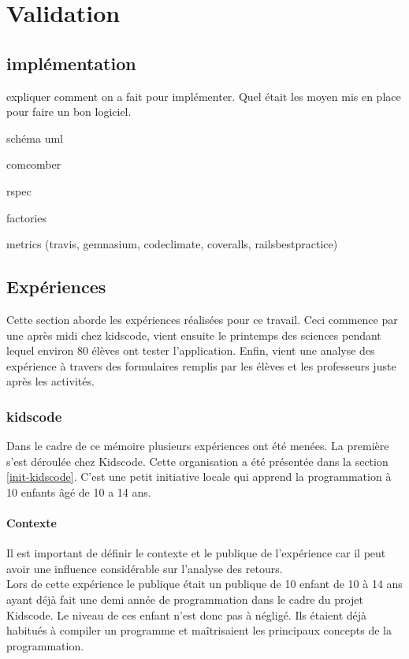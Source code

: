 \chapter{Validation}
\section{implémentation}
expliquer comment on a fait pour implémenter. Quel était les moyen mis en place pour faire un bon logiciel.

schéma uml

comcomber

rspec

factories

metrics (travis, gemnasium, codeclimate, coveralls, railsbestpractice)

\section{Expériences}
Cette section aborde les expériences réalisées pour ce travail. Ceci commence par une après midi chez kidscode, vient ensuite le printemps des sciences pendant lequel environ 80 élèves ont tester l'application. Enfin, vient une analyse des expérience à travers des formulaires remplis par les élèves et les professeurs juste après les activités. %
\subsection{kidscode}
\label{kidscode}
Dans le cadre de ce mémoire plusieurs expériences ont été menées. La première s'est déroulée chez Kidscode. Cette organisation a été présentée dans la section \ref{init-kidscode}. C'est une petit initiative locale qui apprend la programmation à 10 enfants âgé de 10 a 14 ans.

\subsubsection{Contexte}
\label{context-kidscode}
Il est important de définir le contexte et le publique de l'expérience car il peut avoir une influence considérable sur l'analyse des retours.\\

Lors de cette expérience le publique était un publique de 10 enfant de 10 à 14 ans ayant déjà fait une demi année de programmation dans le cadre du projet Kidscode. Le niveau de ces enfant n'est donc pas à négligé. Ils étaient déjà habitués à compiler un programme et maîtrisaient les principaux concepts de la programmation.\\

